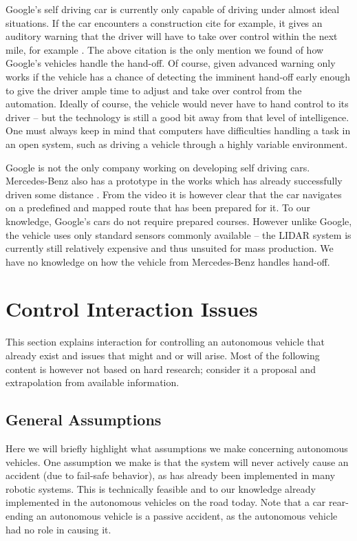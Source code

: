 \documentclass{acm_proc_article-sp}
\begin{document}
Google's self driving car is currently only capable of driving under almost ideal situations.
If the car encounters a construction cite for example, it gives an auditory warning that the driver will have to take over control within the next mile, for example \cite{www:newyorker_google_car}.
The above citation is the only mention we found of how Google's vehicles handle the hand-off.
Of course, given advanced warning only works if the vehicle has a chance of detecting the imminent hand-off early enough to give the driver ample time to adjust and take over control from the automation.
Ideally of course, the vehicle would never have to hand control to its driver – but the technology is still a good bit away from that level of intelligence.
One must always keep in mind that computers have difficulties handling a task in an open system, such as driving a vehicle through a highly variable environment.

Google is not the only company working on developing self driving cars.
Mercedes-Benz also has a prototype in the works which has already successfully driven some distance \cite{www:mercedes_autonomous}.
From the video it is however clear that the car navigates on a predefined and mapped route that has been prepared for it.
To our knowledge, Google's cars do not require prepared courses.
However unlike Google, the vehicle uses only standard sensors commonly available – the LIDAR system is currently still relatively expensive and thus unsuited for mass production.
We have no knowledge on how the vehicle from Mercedes-Benz handles hand-off.

\section{Control Interaction Issues}

This section explains interaction for controlling an autonomous vehicle that already exist and issues that might and or will arise.
Most of the following content is however not based on hard research; consider it a proposal and extrapolation from available information.

\subsection{General Assumptions}

Here we will briefly highlight what assumptions we make concerning autonomous vehicles.
One assumption we make is that the system will never actively cause an accident (due to fail-safe behavior), as has already been implemented in many robotic systems.
This is technically feasible and to our knowledge already implemented in the autonomous vehicles on the road today.
Note that a car rear-ending an autonomous vehicle is a passive accident, as the autonomous vehicle had no role in causing it.
\end{document}
